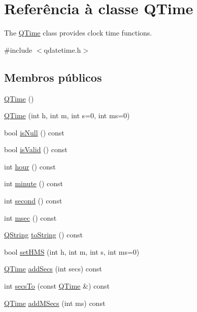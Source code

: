 \hypertarget{class_q_time}{\section{Referência à classe Q\-Time}
\label{class_q_time}
}


The \hyperlink{class_q_time}{Q\-Time} class provides clock time functions.  




{\ttfamily \#include $<$qdatetime.\-h$>$}

\subsection*{Membros públicos}
\begin{DoxyCompactItemize}
\item 
\hyperlink{class_q_time_a552c7e3a44ba541698c76e3145229f53}{Q\-Time} ()
\item 
\hyperlink{class_q_time_a8b7b3604e9750b381e581e39684eb98c}{Q\-Time} (int h, int m, int s=0, int ms=0)
\item 
bool \hyperlink{class_q_time_ac02f2a4d7312eb91f40980adfd4e31b2}{is\-Null} () const 
\item 
bool \hyperlink{class_q_time_aac1b70a2ed67ead038c4d3f5ac4d8a81}{is\-Valid} () const 
\item 
int \hyperlink{class_q_time_a2dedaa57056ea32bb30667c91ba268d5}{hour} () const 
\item 
int \hyperlink{class_q_time_a21f6d954cfd2eea55a49ff62ae2d551c}{minute} () const 
\item 
int \hyperlink{class_q_time_a0e08c193e9dd09b2b7cb15557e3232eb}{second} () const 
\item 
int \hyperlink{class_q_time_ac5c4d837560caa83b7330036b7b936d2}{msec} () const 
\item 
\hyperlink{class_q_string}{Q\-String} \hyperlink{class_q_time_a8aabbf2e3c7be33fa5769a5eab3eef6f}{to\-String} () const 
\item 
bool \hyperlink{class_q_time_aeded853d87933add7e9ba0261befef53}{set\-H\-M\-S} (int h, int m, int s, int ms=0)
\item 
\hyperlink{class_q_time}{Q\-Time} \hyperlink{class_q_time_a91387581e8790223e0437fdd445728e6}{add\-Secs} (int secs) const 
\item 
int \hyperlink{class_q_time_a5683a7426f32f13254570f80d39def70}{secs\-To} (const \hyperlink{class_q_time}{Q\-Time} \&) const 
\item 
\hyperlink{class_q_time}{Q\-Time} \hyperlink{class_q_time_ac22280e472105e0265e8e23a9ad49456}{add\-M\-Secs} (int ms) const 

\end{DoxyCompactItemize}
